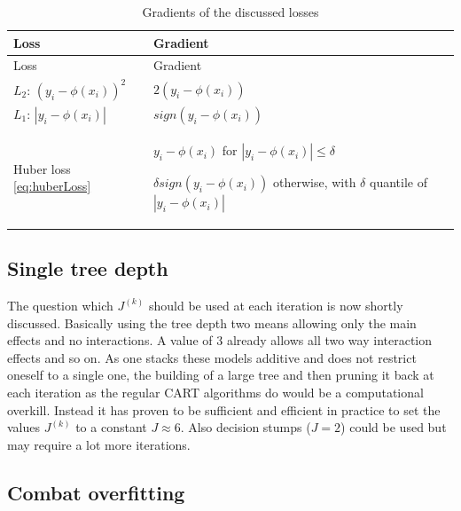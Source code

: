 \documentclass[
]{book}
\begin{document}
\begin{longtable}[]{@{}
  >{\raggedright\arraybackslash}p{}
  >{\raggedright\arraybackslash}p{}@{}}
\caption{\label{tab:lossGradients} Gradients of the discussed losses \citep{elements}}\tabularnewline
\toprule
Loss & Gradient \\
\midrule
\endfirsthead
\toprule
Loss & Gradient \\
\midrule
\endhead
\(L_2\): \((y_i - \phi(x_i))^2\) & \(2(y_i - \phi(x_i))\) \\
\(L_1\): \(|y_i - \phi(x_i)|\) & \(sign(y_i - \phi(x_i))\) \\
Huber loss \eqref{eq:huberLoss} & \(y_i - \phi(x_i)\) for \(|y_i - \phi(x_i)| \leq \delta\)

\(\delta sign(y_i - \phi(x_i))\) otherwise, with \(\delta\) quantile of \(|y_i - \phi(x_i)|\) \\
\bottomrule
\end{longtable}

\hypertarget{single-tree-depth}{%
\subsection{Single tree depth}\label{single-tree-depth}}

The question which \(J^{(k)}\) should be used at each iteration is now shortly discussed. Basically using the tree depth two means allowing only the main effects and no interactions. A value of 3 already allows all two way interaction effects and so on. As one stacks these models additive and does not restrict oneself to a single one, the building of a large tree and then pruning it back at each iteration as the regular CART algorithms do would be a computational overkill. Instead it has proven to be sufficient and efficient in practice to set the values \(J^{(k)}\) to a constant \(J \approx 6\).\citep{elements} Also decision stumps (\(J = 2\)) could be used but may require a lot more iterations.

\hypertarget{combat-overfitting}{%
\subsection{Combat overfitting}\label{combat-overfitting}}
\end{document}
